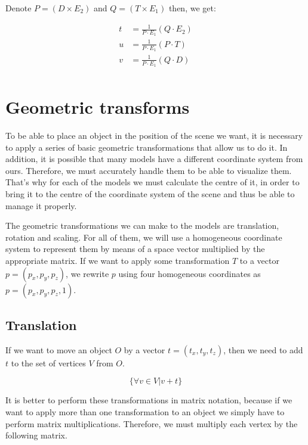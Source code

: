 \documentclass[titlepage,12pt]{report}
\begin{document}
Denote $P = \left( D \times E_2 \right) $ and $Q = \left( T \times E_1 \right)$ then, we get:

\begin{equation}
\begin{split}
t & = \frac{1}{P \cdot E_1} \left(Q \cdot E_2 \right) \\
u & = \frac{1}{P \cdot E_1} \left(P \cdot T \right) \\
v & = \frac{1}{P \cdot E_1} \left(Q \cdot D \right) \\
\end{split}
\end{equation}

\section{Geometric transforms}

To be able to place an object in the position of the scene we want, it is necessary to apply a series of basic geometric transformations that allow us to do it. In addition, it is possible that many models have a different coordinate system from ours. Therefore, we must accurately handle them to be able to visualize them. That's why for each of the models we must calculate the centre of it, in order to bring it to the centre of the coordinate system of the scene and thus be able to manage it properly.

The geometric transformations we can make to the models are translation, rotation and scaling. For all of them, we will use a homogeneous coordinate system to represent them by means of a space vector multiplied by the appropriate matrix. If we want to apply some transformation $T$ to a  vector $p = (p_x, p_y, p_z)$, we rewrite $p$ using four homogeneous coordinates as $p = (p_x, p_y, p_z, 1)$.

\subsection{Translation}

If we want to move an object $O$ by a vector $t = (t_x, t_y, t_z)$, then we need to add $t$ to the set of vertices $V$ from $O$.

\begin{equation}
\{\forall v \in V | v + t\}
\end{equation}

It is better to perform these transformations in matrix notation, because if we want to apply more than one transformation to an object we simply have to perform matrix multiplications. Therefore, we must multiply each vertex by the following matrix.
\end{document}
